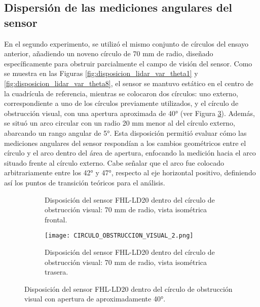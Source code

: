 \subsection{Dispersión de las mediciones angulares del sensor}
\label{mediciones_angulares}
En el segundo experimento, se utilizó el mismo conjunto de círculos del ensayo anterior, añadiendo un noveno círculo de 70 mm de radio, diseñado específicamente para obstruir parcialmente el campo de visión del sensor. Como se muestra en las Figuras \ref{fig:disposicion_lidar_var_theta1} y \ref{fig:disposicion_lidar_var_theta8}, el sensor se mantuvo estático en el centro de la cuadrícula de referencia, mientras se colocaron dos círculos: uno externo, correspondiente a uno de los círculos previamente utilizados, y el círculo de obstrucción visual, con una apertura aproximada de 40° (ver Figura \ref{fig:obstrucción_visual}). Además, se situó un arco circular con un radio 20 mm menor al del círculo externo, abarcando un rango angular de 5°. Esta disposición permitió evaluar cómo las mediciones angulares del sensor respondían a los cambios geométricos entre el círculo y el arco  dentro del área de apertura, enfocando la medición hacia el arco situado frente al círculo externo. Cabe señalar que el arco fue colocado arbitrariamente entre los 42° y 47°, respecto al eje horizontal positivo, definiendo así los puntos de transición teóricos para el análisis.

\begin{figure}[H]
	\centering
	\begin{subfigure}{0.45\textwidth}
		\centering
		\caption{Disposición del sensor FHL-LD20 dentro del círculo de obstrucción visual: 70 mm de radio, vista isométrica frontal.}
		\label{fig:obs1}
	\end{subfigure}
	\hspace{1em}
	\begin{subfigure}{0.45\textwidth}
		\centering
		\texttt{[image: CIRCULO\_OBSTRUCCION\_VISUAL\_2.png]}
		\caption{Disposición del sensor FHL-LD20 dentro del círculo de obstrucción visual: 70 mm de radio, vista isométrica trasera.}
		\label{fig:obs2}
	\end{subfigure}
	\caption{Disposición del sensor FHL-LD20 dentro del círculo de obstrucción visual con apertura de aproximadamente 40°.}
	\label{fig:obstrucción_visual}
\end{figure}


